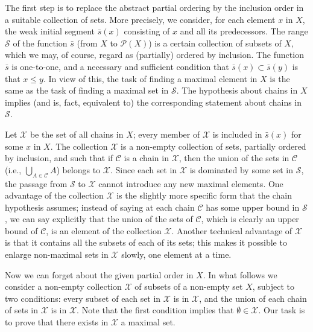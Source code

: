 \subtitle{Proof} The first step is to replace the abstract partial ordering by the inclusion order in a suitable collection of sets. More precisely, we consider, for each element $x$ in $X$, the weak initial segment $\bar{s}(x)$ consisting of $x$ and all its predecessors. The range $\mathcal{S}$ of the function $\bar{s}$ (from $X$ to $\mathcal{P}(X)$) is a certain collection of subsets of $X$, which we may, of course, regard as (partially) ordered by inclusion. The function $\bar{s}$ is one-to-one, and a necessary and sufficient condition that $\bar{s}(x) \subset \bar{s}(y)$ is that $x \le y$. In view of this, the task of finding a maximal element in $X$ is the same as the task of finding a maximal set in $\mathcal{S}$. The hypothesis about chains in $X$ implies (and is, fact, equivalent to) the corresponding statement about chains in $\mathcal{S}$. 

Let $\mathcal{X}$ be the set of all chains in $X$; every member of $\mathcal{X}$ is included in $\bar{s}(x)$ for some $x$ in $X$. The collection $\mathcal{X}$ is a non-empty collection of sets, partially ordered by inclusion, and such that if $\mathcal{C}$ is a chain in $\mathcal{X}$, then the union of the sets in $\mathcal{C}$ (i.e., $\bigcup_{A \in \mathcal{C}} A$) belongs to $\mathcal{X}$. Since each set in $\mathcal{X}$ is dominated by some set in $\mathcal{S}$, the passage from $\mathcal{S}$ to $\mathcal{X}$ cannot introduce any new maximal elements. One advantage of the collection $\mathcal{X}$ is the slightly more specific form that the chain hypothesis assumes; instead of saying at each chain $\mathcal{C}$ has some upper bound in $\mathcal{S}$, we can say explicitly that the union of the sets of $\mathcal{C}$, which is clearly an upper bound of $\mathcal{C}$, is an element of the collection $\mathcal{X}$. Another technical advantage of $\mathcal{X}$ is that it contains all the subsets of each of its sets; this makes it possible to enlarge non-maximal sets in $\mathcal{X}$ slowly, one element at a time. 

Now we can forget about the given partial order in $X$. In what follows we consider a non-empty collection $\mathcal{X}$ of subsets of a non-empty set $X$, subject to two conditions: every subset of each set in $\mathcal{X}$ is in $\mathcal{X}$, and the union of each chain of sets in $\mathcal{X}$ is in $\mathcal{X}$. Note that the first condition implies that $\emptyset \in \mathcal{X}$. Our task is to prove that there exists in $\mathcal{X}$ a maximal set. 

